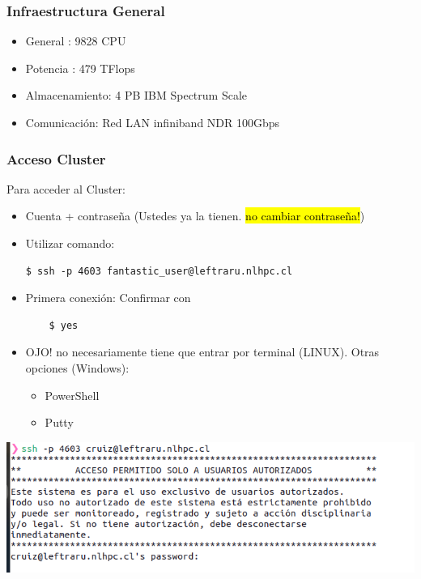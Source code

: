 \documentclass[aspectratio=169,professionalfonts]{beamer}
\begin{document}
\begin{frame}[fragile]
\frametitle{\textbf{Infraestructura General}}
\begin{itemize}
    \item General : 9828 CPU
        \vspace{0.5em} %
    \item Potencia : 479 TFlops
        \vspace{0.5em} %
    \item Almacenamiento: 4 PB IBM Spectrum Scale
        \vspace{0.5em} 
    \item Comunicación: Red LAN infiniband NDR 100Gbps
\end{itemize}
    
\end{frame}




\begin{frame}[fragile]
\frametitle{\textbf{Acceso Cluster}}

Para acceder al Cluster: 
\begin{itemize}
    \item Cuenta + contraseña (Ustedes ya la tienen. \hl{no cambiar contraseña!})
    
    \item Utilizar comando: 
     \begin{verbatim}
$ ssh -p 4603 fantastic_user@leftraru.nlhpc.cl
  \end{verbatim}
    \item Primera conexión: Confirmar con 
    \begin{verbatim}
    $ yes 
    \end{verbatim} 
    \item  OJO! no necesariamente tiene que entrar por terminal (LINUX). Otras opciones (Windows): 
        \begin{itemize}
            \item PowerShell
            \item Putty
        \end{itemize}
    \end{itemize}
\begin{center}
\includegraphics[scale=0.3]{FIGURES/ssh_2.png}
\end{center}
     \vspace{0.5em}
\end{frame}
\end{document}
